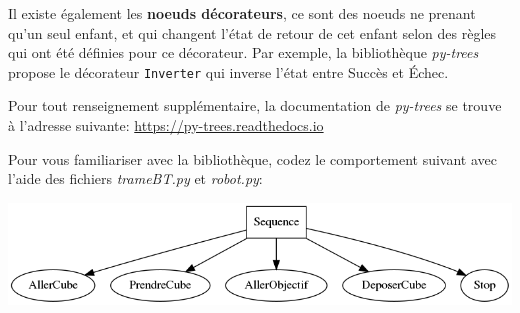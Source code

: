 \documentclass{article}
\begin{document}
\noindent
Il existe également les \textbf{noeuds décorateurs}, ce sont des noeuds ne prenant qu'un seul enfant, et qui changent l'état de retour de cet enfant selon des règles qui ont été définies pour ce décorateur. Par exemple, la bibliothèque \emph{py-trees} propose le décorateur \verb~Inverter~ qui inverse l'état entre Succès et Échec.

\noindent
Pour tout renseignement supplémentaire, la documentation de \emph{py-trees} se trouve à l'adresse suivante: \url{https://py-trees.readthedocs.io}

\noindent
Pour vous familiariser avec la bibliothèque, codez le comportement suivant avec l'aide des fichiers \emph{trameBT.py} et \emph{robot.py}:

\includegraphics[width=\linewidth]{./img/robot.png}
\end{document}
